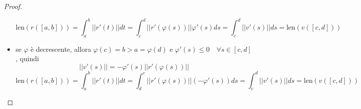\documentclass[12pt, a4paper]{article}
\theoremstyle{break}
\begin{document}
\begin{proof}
\begin{itemize}
\[		      \]
		      \[
			      \text{len}(r([a,b])) =
			      \int_{a}^{b} || r'(t) || dt =
			      \int_{c}^{d} || r'(\varphi(s))|| \varphi'(s) ds =
			      \int_{c}^{d} || v'(s) || ds =
			      \text{len}(v([c,d]))
		      \]
		\item se $\varphi$ è decrescente, allora $\varphi(c) = b > a =
			      \varphi(d)$ e $\varphi'(s) \leq 0 \quad \forall s \in [c,d]$,
		      quindi
		      \[
			      ||v'(s)|| = -\varphi'(s) || r'(\varphi(s))||
		      \]
		      \[
			      \text{len}(r([a,b])) =
			      \int_{a}^{b} || r'(t) || dt =
			      \int_{d}^{c} || r'(\varphi(s))|| (-\varphi'(s)) ds =
			      \int_{c}^{d} || v'(s) || ds =
			      \text{len}(v([c,d]))
		      \]
	\end{itemize}
\end{proof}
\end{document}
